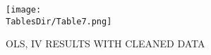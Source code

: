 \hypertarget{OLSIVClean}{}
\begin{table}

  \centerline{\texttt{[image: \\TablesDir/Table7.png]}}
  \caption{\scriptsize OLS, IV RESULTS WITH CLEANED DATA} 
  \label{tab:OLSIVClean}
\end{table}